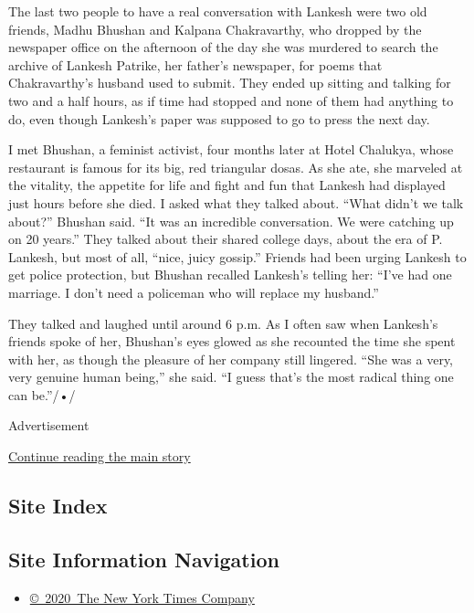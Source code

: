 The last two people to have a real conversation with Lankesh were two
old friends, Madhu Bhushan and Kalpana Chakravarthy, who dropped by the
newspaper office on the afternoon of the day she was murdered to search
the archive of Lankesh Patrike, her father's newspaper, for poems that
Chakravarthy's husband used to submit. They ended up sitting and talking
for two and a half hours, as if time had stopped and none of them had
anything to do, even though Lankesh's paper was supposed to go to press
the next day.

I met Bhushan, a feminist activist, four months later at Hotel Chalukya,
whose restaurant is famous for its big, red triangular dosas. As she
ate, she marveled at the vitality, the appetite for life and fight and
fun that Lankesh had displayed just hours before she died. I asked what
they talked about. ``What didn't we talk about?'' Bhushan said. ``It was
an incredible conversation. We were catching up on 20 years.'' They
talked about their shared college days, about the era of P. Lankesh, but
most of all, ``nice, juicy gossip.'' Friends had been urging Lankesh to
get police protection, but Bhushan recalled Lankesh's telling her:
``I've had one marriage. I don't need a policeman who will replace my
husband.''

They talked and laughed until around 6 p.m. As I often saw when
Lankesh's friends spoke of her, Bhushan's eyes glowed as she recounted
the time she spent with her, as though the pleasure of her company still
lingered. ``She was a very, very genuine human being,'' she said. ``I
guess that's the most radical thing one can be.''/•/

Advertisement

\protect\hyperlink{after-bottom}{Continue reading the main story}

\hypertarget{site-index}{%
\subsection{Site Index}\label{site-index}}

\hypertarget{site-information-navigation}{%
\subsection{Site Information
Navigation}\label{site-information-navigation}}

\begin{itemize}
\tightlist
\item
  \href{https://help.nytimes3xbfgragh.onion/hc/en-us/articles/115014792127-Copyright-notice}{©~2020~The
  New York Times Company}
\end{itemize}

